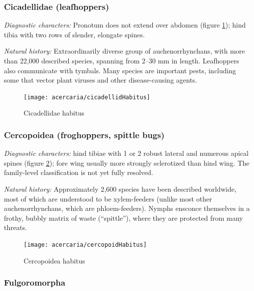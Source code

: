 \subsubsection{Cicadellidae (leafhoppers)}
\noindent{}\textit{Diagnostic characters:} Pronotum does not extend over abdomen (figure \ref{fig:cicadellids}); hind tibia with two rows of slender, elongate spines.\vspace{3mm}

\noindent{}\textit{Natural history:} Extraordinarily diverse group of auchenorrhynchans, with more than 22,000 described species, spanning from 2--30 mm in length. Leafhoppers also communicate with tymbals. Many species are important pests, including some that vector plant viruses and other disease-causing agents.\vspace{3mm}


\begin{figure}[ht!]
 \centering
  \texttt{[image: acercaria/cicadellidHabitus]}
  \caption{Cicadellidae habitus \citep[][Plate I]{runner1923three}}
 \label{fig:cicadellids}
\end{figure}

\subsubsection{Cercopoidea (froghoppers, spittle bugs)}
\noindent{}\textit{Diagnostic characters:} hind tibiae with 1 or 2 robust lateral and numerous apical spines (figure \ref{fig:cercopid}); fore wing usually more strongly sclerotized than hind wing. The family-level classification is not yet fully resolved.\vspace{3mm}

\noindent{}\textit{Natural history:} Approximately 2,600 species have been described worldwide, most of which are understood to be xylem-feeders (unlike most other auchenorrhynchans, which are phloem-feeders). Nymphs ensconce themselves in a frothy, bubbly matrix of waste (``spittle''), where they are protected from many threats.\vspace{3mm}

\begin{figure}[ht!]
 \centering
 \texttt{[image: acercaria/cercopoidHabitus]}
 \caption{Cercopoidea habitus \citep[][Fig. 18]{bhlitem140074}}
 \label{fig:cercopid}
\end{figure}

\subsubsection*{Fulgoromorpha}

